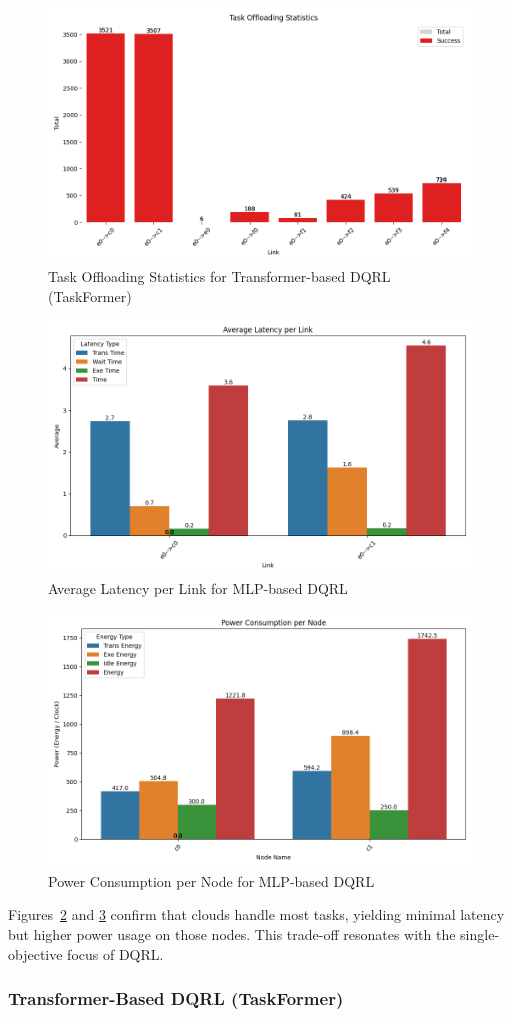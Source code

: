\begin{figure}[H]
    \centering
    \includegraphics[width=0.5\linewidth]{figs/taskformer_offloading_statistics.png}
    \caption{Task Offloading Statistics for Transformer-based DQRL (TaskFormer)}
    \label{fig:taskformer-offloading-stats}
\end{figure}

\begin{figure}[H]
    \centering
    \includegraphics[width=0.5\linewidth]{figs/mlp_avg_latency_per_link.png}
    \caption{Average Latency per Link for MLP-based DQRL}
    \label{fig:mlp-avg-latency}
\end{figure}

\begin{figure}[H]
    \centering
    \includegraphics[width=0.5\linewidth]{figs/mlp_power_consumption_per_node.png}
    \caption{Power Consumption per Node for MLP-based DQRL}
    \label{fig:mlp-power-consumption}
\end{figure}

Figures~\ref{fig:mlp-avg-latency} and \ref{fig:mlp-power-consumption} confirm that clouds handle most tasks, yielding minimal latency but higher power usage on those nodes. This trade-off resonates with the single-objective focus of DQRL.
\subsubsection{Transformer-Based DQRL (TaskFormer)}

